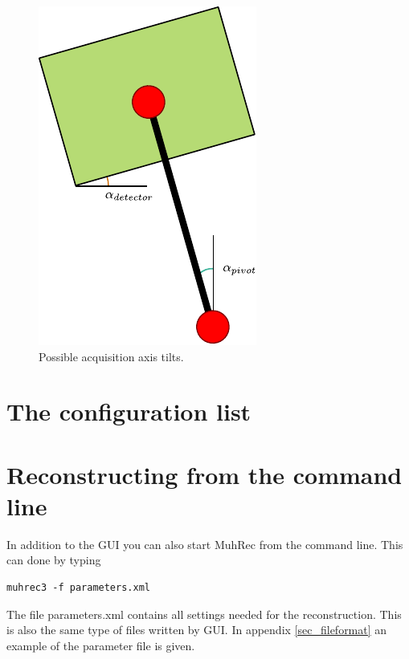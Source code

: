 \documentclass[a4paper]{scrreprt}
\begin{document}
\begin{figure}[ht!]
\centering
\includegraphics{figures/axis_tilt.pdf}
\caption{Possible acquisition axis tilts.}\label{fig_axistilt}
\end{figure}

\section{The configuration list}


\section{Reconstructing from the command line}\label{sec_cmdline}
In addition to the GUI you can also start MuhRec from the command line. This can done by typing
\begin{verbatim}
muhrec3 -f parameters.xml
\end{verbatim}
The file parameters.xml contains all settings needed for the reconstruction.
This is also the same type of files written by GUI. In appendix
\ref{sec_fileformat} an example of the parameter file is given.
\end{document}
